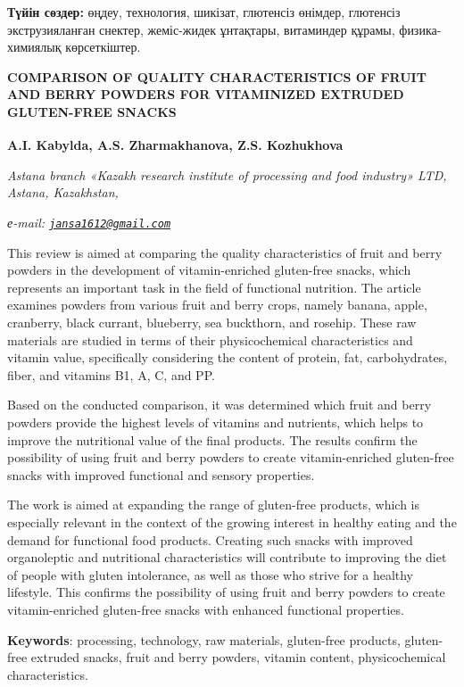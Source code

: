 {{\bfseries Түйін сөздер:} өңдеу, технология, шикізат, глютенсіз өнімдер,
глютенсіз экструзияланған снектер, жеміс-жидек ұнтақтары, витаминдер
құрамы, физика-химиялық көрсеткіштер.

{\bfseries COMPARISON OF QUALITY CHARACTERISTICS OF FRUIT AND BERRY POWDERS
FOR VITAMINIZED EXTRUDED GLUTEN-FREE SNACKS}

{\bfseries A.I. Kabylda, A.S. Zharmakhanova, Z.S.
Kozhukhova\textsuperscript{\envelope }}

\emph{Astana branch «Kazakh research institute of processing and food
industry» LTD, Astana, Kazakhstan,}

\emph{е-mail:
\href{mailto:jansa1612@gmail.com}{\nolinkurl{jansa1612@gmail.com}}}

This review is aimed at comparing the quality characteristics of fruit
and berry powders in the development of vitamin-enriched gluten-free
snacks, which represents an important task in the field of functional
nutrition. The article examines powders from various fruit and berry
crops, namely banana, apple, cranberry, black currant, blueberry, sea
buckthorn, and rosehip. These raw materials are studied in terms of
their physicochemical characteristics and vitamin value, specifically
considering the content of protein, fat, carbohydrates, fiber, and
vitamins B1, A, C, and PP.

Based on the conducted comparison, it was determined which fruit and
berry powders provide the highest levels of vitamins and nutrients,
which helps to improve the nutritional value of the final products. The
results confirm the possibility of using fruit and berry powders to
create vitamin-enriched gluten-free snacks with improved functional and
sensory properties.

The work is aimed at expanding the range of gluten-free products, which
is especially relevant in the context of the growing interest in healthy
eating and the demand for functional food products. Creating such snacks
with improved organoleptic and nutritional characteristics will
contribute to improving the diet of people with gluten intolerance, as
well as those who strive for a healthy lifestyle. This confirms the
possibility of using fruit and berry powders to create vitamin-enriched
gluten-free snacks with enhanced functional properties.

{\bfseries Keywords}: processing, technology, raw materials, gluten-free
products, gluten-free extruded snacks, fruit and berry powders, vitamin
content, physicochemical characteristics.

}
